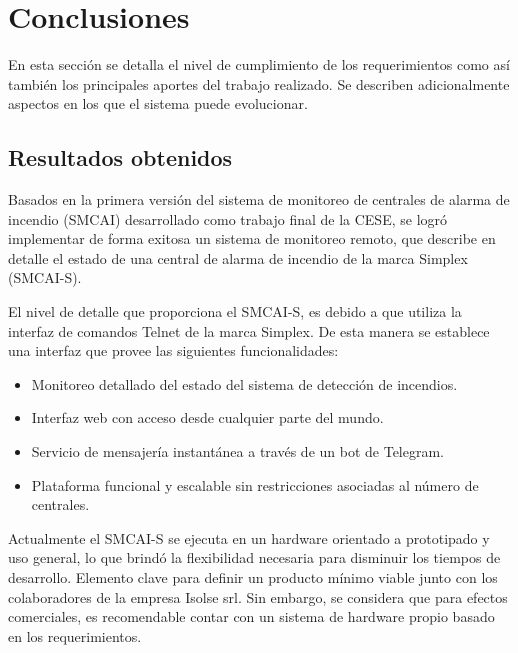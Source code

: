 
\chapter{Conclusiones} %

\label{Chapter5} %

En esta sección se detalla el nivel de cumplimiento de los requerimientos como así también los principales aportes del trabajo realizado. Se describen adicionalmente aspectos en los que el sistema puede evolucionar.



\section{Resultados obtenidos}


Basados en la primera versión del sistema de monitoreo de centrales de alarma de incendio (SMCAI) desarrollado como trabajo final de la CESE, se logró implementar de forma exitosa un sistema de monitoreo remoto, que describe en detalle el estado de una central de alarma de incendio de la marca Simplex (SMCAI-S).

El nivel de detalle que proporciona el SMCAI-S, es debido a que utiliza la interfaz de comandos Telnet de la marca Simplex. De esta manera se establece una interfaz que provee las siguientes funcionalidades:
\begin{itemize}
\item Monitoreo detallado del estado del sistema de detección de incendios.
\item Interfaz web con acceso desde cualquier parte del mundo.
\item Servicio de mensajería instantánea a través de un bot de Telegram.
\item Plataforma funcional y escalable sin restricciones asociadas al número de centrales.
\end{itemize}

Actualmente el SMCAI-S se ejecuta en un hardware orientado a prototipado y uso general, lo que brindó la flexibilidad necesaria para disminuir los tiempos de desarrollo. Elemento clave para definir un producto mínimo viable junto con los colaboradores de la empresa Isolse srl. Sin embargo, se considera que para efectos comerciales, es recomendable contar con un sistema de hardware propio basado en los requerimientos.

